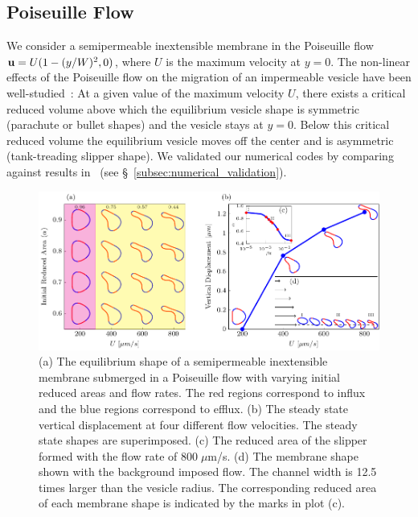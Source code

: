 \documentclass[prb,preprint,showpacs,preprintnumbers,amsmath,amssymb,longbibliography]{revtex4-1}
\newif\ifTikz
\begin{document}
\subsection{Poiseuille Flow}
We consider a semipermeable inextensible membrane in the Poiseuille flow $\mathbf{u} =
U(1-(y/W)^2,0)$, where $U$ is the maximum velocity at $y=0$. The
non-linear effects of the Poiseuille flow on the migration of an
impermeable vesicle have been well-studied~\cite{kao-bir-mis2009}: At a
given value of the maximum velocity $U$, there exists a critical reduced
volume above which the equilibrium vesicle shape is symmetric (parachute
or bullet shapes) and the vesicle stays at $y=0$. Below this critical
reduced volume the equilibrium vesicle moves off the center and is
asymmetric (tank-treading slipper shape). We validated our numerical
codes by comparing against results in~\citet{kao-bir-mis2009} (see
\S~\ref{subsec:numerical_validation}).

\begin{figure}[htp]
  \centering
  \ifTikz
  
  \else
  \includegraphics{figures/parabolicComposite.pdf}
  \fi
  \caption{\label{fig:parabolicComposite} (a) The equilibrium shape of
  a semipermeable inextensible membrane submerged in a Poiseuille flow with varying
  initial reduced areas and flow rates. The red regions correspond to
  influx and the blue regions correspond to efflux. (b) The steady
  state vertical displacement at four different flow velocities. The
  steady state shapes are superimposed. (c) The reduced area of the
  slipper formed with the flow rate of $800 \; \mu$m/s. (d) The membrane
  shape shown with the background imposed flow. The channel width is
  12.5 times larger than the vesicle radius. The corresponding reduced
  area of each membrane shape is indicated by the marks in plot (c).}
\end{figure}
\end{document}
